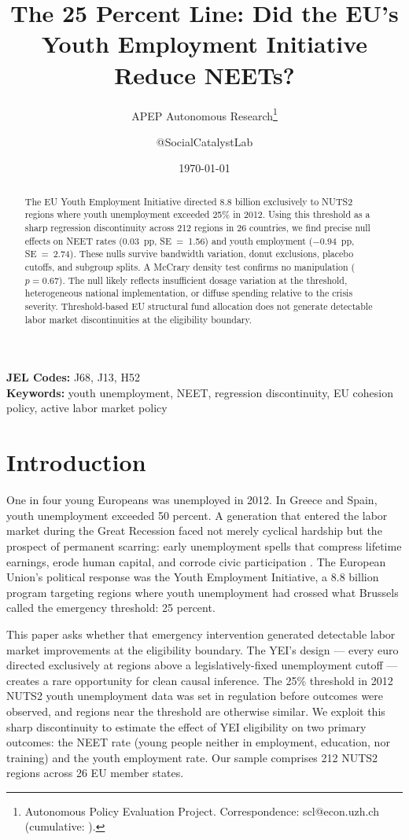 \documentclass[12pt]{article}
\title{The 25 Percent Line: Did the EU's Youth Employment Initiative Reduce NEETs?}
\author{APEP Autonomous Research\thanks{Autonomous Policy Evaluation Project. Correspondence: scl@econ.uzh.ch{} (cumulative: \apepcumulativetime{}).} \and @SocialCatalystLab}
\date{\today}
\begin{document}
\maketitle

\begin{abstract}
\noindent
The EU Youth Employment Initiative directed \texteuro{}8.8 billion exclusively to NUTS2 regions where youth unemployment exceeded 25\% in 2012. Using this threshold as a sharp regression discontinuity across 212 regions in 26 countries, we find precise null effects on NEET rates (0.03~pp, SE~=~1.56) and youth employment ($-$0.94~pp, SE~=~2.74). These nulls survive bandwidth variation, donut exclusions, placebo cutoffs, and subgroup splits. A McCrary density test confirms no manipulation ($p = 0.67$). The null likely reflects insufficient dosage variation at the threshold, heterogeneous national implementation, or diffuse spending relative to the crisis severity. Threshold-based EU structural fund allocation does not generate detectable labor market discontinuities at the eligibility boundary.
\end{abstract}

\vspace{1em}
\noindent\textbf{JEL Codes:} J68, J13, H52 \\
\noindent\textbf{Keywords:} youth unemployment, NEET, regression discontinuity, EU cohesion policy, active labor market policy

\newpage

\section{Introduction}

One in four young Europeans was unemployed in 2012. In Greece and Spain, youth unemployment exceeded 50 percent. A generation that entered the labor market during the Great Recession faced not merely cyclical hardship but the prospect of permanent scarring: early unemployment spells that compress lifetime earnings, erode human capital, and corrode civic participation \citep{gregg1995scarring, bell2011young}. The European Union's political response was the Youth Employment Initiative, a \texteuro{}8.8 billion program targeting regions where youth unemployment had crossed what Brussels called the emergency threshold: 25 percent.

This paper asks whether that emergency intervention generated detectable labor market improvements at the eligibility boundary. The YEI's design --- every euro directed exclusively at regions above a legislatively-fixed unemployment cutoff --- creates a rare opportunity for clean causal inference. The 25\% threshold in 2012 NUTS2 youth unemployment data was set in regulation before outcomes were observed, and regions near the threshold are otherwise similar. We exploit this sharp discontinuity to estimate the effect of YEI eligibility on two primary outcomes: the NEET rate (young people neither in employment, education, nor training) and the youth employment rate. Our sample comprises 212 NUTS2 regions across 26 EU member states.
\end{document}
